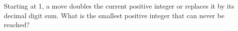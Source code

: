 Starting at 1, a move doubles the current positive integer or replaces it by its decimal digit sum. What is the smallest positive integer that can never be reached?
